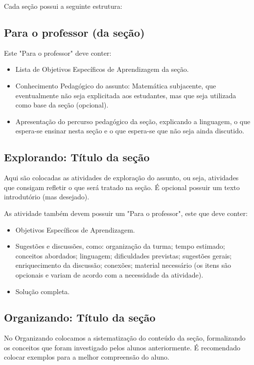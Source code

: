 Cada seção possui a seguinte estrutura:

\subsection{Para o professor (da seção)}
Este "Para o professor"{} deve conter:
\begin{itemize}
\item Lista de Objetivos Específicos de Aprendizagem da seção.
\item Conhecimento Pedagógico do assunto: Matemática subjacente, que eventualmente não seja explicitada aos estudantes, mas que seja utilizada como base da seção (opcional).
\item Apresentação do percurso pedagógico da seção, explicando a linguagem, o que espera-se ensinar nesta seção e o que espera-se que não seja ainda discutido.
\end{itemize}

\def\currentcolor{session1}
\subsection{Explorando: Título da seção}

Aqui são colocadas as atividades de exploração do assunto, ou seja, atividades que consigam refletir o que será tratado na seção. É opcional possuir um texto introdutório (mas desejado).

As atividade também devem possuir um "Para o professor", este que deve conter:
\begin{itemize}
\item Objetivos Específicos de Aprendizagem.
\item Sugestões e discussões, como: organização da turma; tempo estimado; conceitos abordados; linguagem; dificuldades previstas; sugestões gerais; enriquecimento da discussão; conexões; material necessário (os itens são opcionais e variam de acordo com a necessidade da atividade).
\item Solução completa.
\end{itemize}

\def\currentcolor{session4}
\subsection{Organizando: Título da seção}

No Organizando colocamos a sistematização do conteúdo da seção, formalizando os conceitos que foram investigado pelos alunos anteriormente. É recomendado colocar exemplos para a melhor compreensão do aluno.

